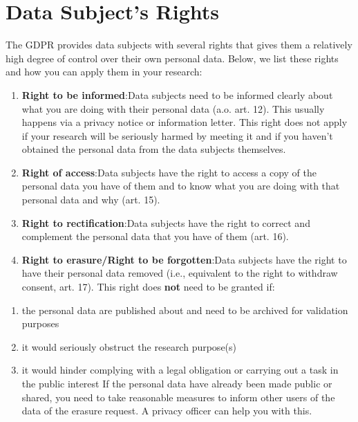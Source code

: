 \documentclass[
]{book}
\providecommand{\tightlist}{%
  \setlength{\itemsep}{0pt}\setlength{\parskip}{0pt}}
\begin{document}
\hypertarget{data-subject-rights}{%
\section*{Data Subject's Rights}\label{data-subject-rights}}

The GDPR provides data subjects with several rights that gives them a relatively high degree of control over their own personal data. Below, we list these rights and how you can apply them in your research:

\begin{enumerate}
\def\labelenumi{\arabic{enumi}.}
\tightlist
\item
  \textbf{Right to be informed}:Data subjects need to be informed clearly about what you are doing with their personal data (a.o. art. 12). This usually happens via a privacy notice or information letter. This right does not apply if your research will be seriously harmed by meeting it and if you haven't obtained the personal data from the data subjects themselves.
\item
  \textbf{Right of access}:Data subjects have the right to access a copy of the personal data you have of them and to know what you are doing with that personal data and why (art. 15).
\item
  \textbf{Right to rectification}:Data subjects have the right to correct and complement the personal data that you have of them (art. 16).
\item
  \textbf{Right to erasure/Right to be forgotten}:Data subjects have the right to have their personal data removed (i.e., equivalent to the right to withdraw consent, art. 17). This right does \textbf{not} need to be granted if:
\end{enumerate}

\begin{enumerate}
\def\labelenumi{\alph{enumi}.}
\tightlist
\item
  the personal data are published about and need to be archived for validation purposes
\item
  it would seriously obstruct the research purpose(s)
\item
  it would hinder complying with a legal obligation or carrying out a task in the public interest
  If the personal data have already been made public or shared, you need to take reasonable measures to inform other users of the data of the erasure request. A privacy officer can help you with this.
\end{enumerate}
\end{document}
